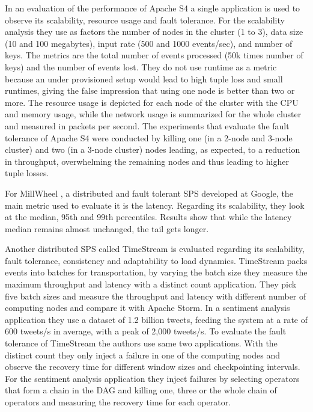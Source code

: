 \documentclass[ppgc,diss,english]{iiufrgs}
\begin{document}
In an evaluation of the performance of Apache S4 \cite{chauhan2012performance} a single application is used to observe its scalability, resource usage and fault tolerance. For the scalability analysis they use as factors the number of nodes in the cluster (1 to 3), data size (10 and 100 megabytes), input rate (500 and 1000 events/sec), and number of keys. The metrics are the total number of events processed (50k times number of keys) and the number of events lost. They do not use runtime as a metric because an under provisioned setup would lead to high tuple loss and small runtimes, giving the false impression that using one node is better than two or more. The resource usage is depicted for each node of the cluster with the CPU and memory usage, while the network usage is summarized for the whole cluster and measured in packets per second. The experiments that evaluate the fault tolerance of Apache S4 were conducted by killing one (in a 2-node and 3-node cluster) and two (in a 3-node cluster) nodes leading, as expected, to a reduction in throughput, overwhelming the remaining nodes and thus leading to higher tuple losses.

For MillWheel \cite{akidau2013millwheel}, a distributed and fault tolerant SPS developed at Google, the main metric used to evaluate it is the latency. Regarding its scalability, they look at the median, 95th and 99th percentiles. Results show that while the latency median remains almost unchanged, the tail gets longer.


Another distributed SPS called TimeStream \cite{qian2013timestream} is evaluated regarding its scalability, fault tolerance, consistency and adaptability to load dynamics. TimeStream packs events into batches for transportation, by varying the batch size they measure the maximum throughput and latency with a distinct count application. They pick five batch sizes and measure the throughput and latency with different number of computing nodes and compare it with Apache Storm. In a sentiment analysis application they use a dataset of 1.2 billion tweets, feeding the system at a rate of 600 tweets/s in average, with a peak of 2,000 tweets/s. To evaluate the fault tolerance of TimeStream the authors use same two applications. With the distinct count they only inject a failure in one of the computing nodes and observe the recovery time for different window sizes and checkpointing intervals. For the sentiment analysis application they inject failures by selecting operators that form a chain in the DAG and killing one, three or the whole chain of operators and measuring the recovery time for each operator.
\end{document}
